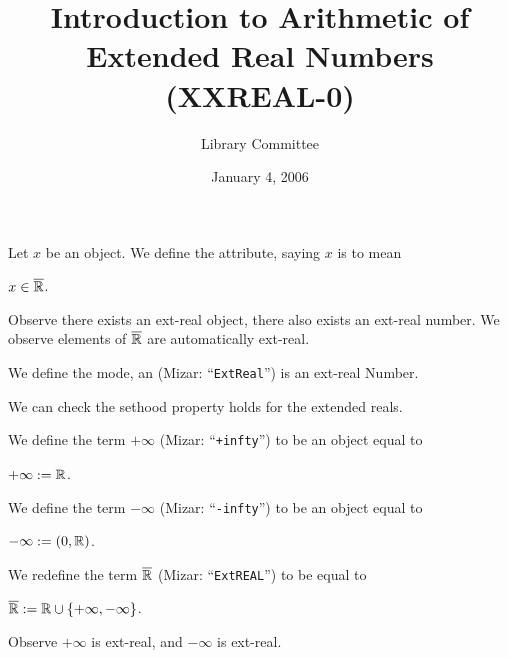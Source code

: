 \documentclass{article}
\title{Introduction to Arithmetic of Extended Real Numbers (XXREAL-0)}
\author{Library Committee}
\date{January 4, 2006}
\begin{document}
\maketitle

\begin{definition}
Let $x$ be an object.
We define the attribute, saying $x$ is  to mean
\begin{defn}
\item $x\in\overline{\mathbb{R}}$.
\end{defn}
\end{definition}

Observe there exists an ext-real object, there also exists an ext-real
number. We observe elements of $\overline{\mathbb{R}}$ are automatically ext-real.

\begin{definition}
We define the mode, an  (Mizar: ``\verb#ExtReal#'') is an ext-real Number.
\end{definition}

We can check the sethood property holds for the extended reals.

\begin{definition}\index{$+\infty$}%
We define the term $+\infty$ (Mizar: ``\verb#+infty#'') to be an object
equal to
\begin{defn}
\item $+\infty := \mathbb{R}$.
\end{defn}
We define the term $-\infty$ (Mizar: ``\verb#-infty#'') to be an object
equal to
\begin{defn}
\item $-\infty := (0,\mathbb{R})$.
\end{defn}
\end{definition}

\begin{definition}
We redefine the term $\overline{\mathbb{R}}$ (Mizar: ``\verb#ExtREAL#'') to be equal to
\begin{defn}
\item $\overline{\mathbb{R}} := \mathbb{R}\cup\{+\infty,-\infty\}$.
\end{defn}
\end{definition}

Observe $+\infty$ is ext-real, and $-\infty$ is ext-real.
\end{document}

